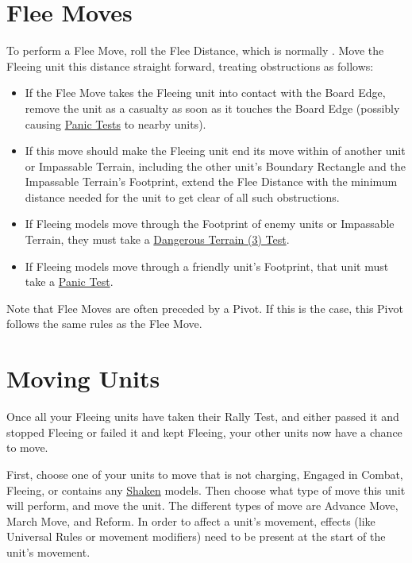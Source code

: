 \section{Flee Moves}
\label{flee_moves}

To perform a Flee Move, roll the Flee Distance, which is normally . Move the Fleeing unit this distance straight forward, treating obstructions as follows:
\begin{itemize}[label={-}]
\item If the Flee Move takes the Fleeing unit into contact with the Board Edge, remove the unit as a casualty as soon as it touches the Board Edge (possibly causing \hyperref[panic_test]{Panic Tests} to nearby units).
\item If this move should make the Fleeing unit end its move within  of another unit or Impassable Terrain, including the other unit's Boundary Rectangle and the Impassable Terrain's Footprint, extend the Flee Distance with the minimum distance needed for the unit to get clear of all such obstructions. 
\item If Fleeing models move through the Footprint of enemy units or Impassable Terrain, they must take a \hyperref[dangerous_terrain]{Dangerous Terrain (3) Test}.
\item If Fleeing models move through a friendly unit's Footprint, that unit must take a \hyperref[panic_test]{Panic Test}.
\end{itemize}

Note that Flee Moves are often preceded by a Pivot. If this is the case, this Pivot follows the same rules as the Flee Move.

\section{Moving Units}
\label{moving_units}

Once all your Fleeing units have taken their Rally Test, and either passed it and stopped Fleeing or failed it and kept Fleeing, your other units now have a chance to move. 

First, choose one of your units to move that is not charging, Engaged in Combat, Fleeing, or contains any \hyperref[shaken]{Shaken} models. Then choose what type of move this unit will perform, and move the unit. The different types of move are Advance Move, March Move, and Reform. In order to affect a unit's movement, effects (like Universal Rules or movement modifiers) need to be present at the start of the unit's movement.

